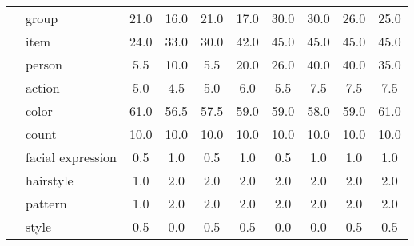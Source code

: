 \begin{table}[ht!]
\begin{tabular}{|c|l|c|c|c|c|c|c|c|c|}
		                                                                  & {group}                                     & 21.0       & 16.0       & 21.0       & 17.0       & 30.0        & 30.0        & 26.0        & 25.0  \\
		                                                                  & {item}                                      & 24.0       & 33.0       & 30.0       & 42.0       & 45.0        & 45.0        & 45.0        & 45.0  \\
		                                                                  & {person}                                    & 5.5        & 10.0       & 5.5        & 20.0       & 26.0        & 40.0        & 40.0        & 35.0  \\
		\hline
		\multirow{7}{*}{\rotatebox[origin=c]{90}{chybějící atr.~s tagem}} & {action}                                    & 5.0        & 4.5        & 5.0        & 6.0        & 5.5         & 7.5         & 7.5         & 7.5   \\
		                                                                  & {color}                                     & 61.0       & 56.5       & 57.5       & 59.0       & 59.0        & 58.0        & 59.0        & 61.0  \\
		                                                                  & {count}                                     & 10.0       & 10.0       & 10.0       & 10.0       & 10.0        & 10.0        & 10.0        & 10.0  \\
		                                                                  & {facial expression}                         & 0.5        & 1.0        & 0.5        & 1.0        & 0.5         & 1.0         & 1.0         & 1.0   \\
		                                                                  & {hairstyle}                                 & 1.0        & 2.0        & 2.0        & 2.0        & 2.0         & 2.0         & 2.0         & 2.0   \\
		                                                                  & {pattern}                                   & 1.0        & 2.0        & 2.0        & 2.0        & 2.0         & 2.0         & 2.0         & 2.0   \\
		                                                                  & {style}                                     & 0.5        & 0.0        & 0.5        & 0.5        & 0.0         & 0.0         & 0.5         & 0.5   \\
		\hline

\end{tabular}
\end{table}
